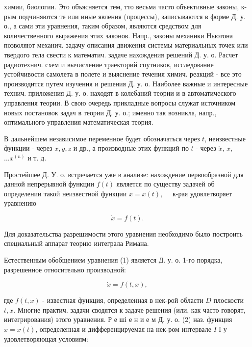 \documentclass[10pt]{article}
\begin{document}
химии, биологии. Это объясняется тем, тто весьма часто объективные законы, к-рым подчиняются те или иные явления (процессы), записываются в форме Д. у. о., а сами эти уравнения, таким образом, являются средством для количественного выражения этих законов. Напр., законы механики Ньютона позволяют механич. задачу описания движения системы материальных точек или твердого тела свести к математич. задаче нахождения решений Д. у. о. Расчет радиотехнич. схем и вычисление траекторий спутников, исследование устойчивости самолета в полете и выяснение течения химич. реакций - все это производится путем изучения и решения Д. у. о. Наиболее важные и интересные технич. приложения Д. у. о. находят в колебаний теории и в автоматического управления теории. В свою очередь прикладные вопросы служат источником новых постановок задач в теории Д. у. о.; именно так возникла, напр., оптимального управления математическая теория.



В дальнейшем независимое переменное будет обозначаться через $t$, неизвестные функции - через $x, y, z$ и др., а производные этих функций по $t$ - через $\dot{x}$, $\ddot{x}$, $\ldots x^{(n)}$ и т. д.



Простейшее Д. У. о. встречается уже в анализе: нахождение первообразной для данной непрерывной функции $f(t)$ является по существу задачей об определении такой неизвестной функции $x=x(t), \quad$ к-рая удовлетворяет уравнению



\[

\dot{x}=f(t) .

\]



Для доказательства разрешимости этого уравнения необходимо было построить специальный аппарат теорию интеграла Римана.



Естественным обобщением уравнения (1) является Д. у. о. 1-го порядка, разрешенное относительно производной:



\[

\dot{x}=f(t, x),

\]



где $f(t, x)$ - известная функция, определенная в нек-рой области $D$ плоскости $t, x$. Многие практич. задачи сводятся к задаче решения (или, как часто говорят, интегрирования) этого уравнения. Р е ші е н и е м Д. у. о. (2) наз. функция $x=x(t)$, определенная и дифференцируемая на нек-ром интервале $I$ І у удовлетворяющая условиям:
\end{document}
